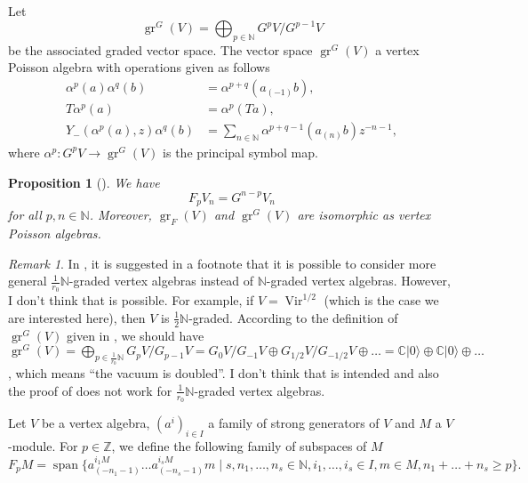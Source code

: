 \documentclass[12pt, reqno]{amsart}
\newtheorem{proposition}[theorem]{Proposition}
\theoremstyle{remark}
\newtheorem{remark}[theorem]{Remark}
\DeclareMathOperator{\Vir}{Vir}
\DeclareMathOperator{\gr}{gr}
\DeclareMathOperator{\vspan}{span}
\newcommand{\vac}{|0\rangle}
\begin{document}
Let
\begin{equation*}
  \gr^G(V) = \bigoplus_{p \in \mathbb{N}}G^pV/G^{p - 1}V
\end{equation*}
be the associated graded vector space.
The vector space $\gr^G(V)$ a vertex Poisson algebra with operations given as follows
\begin{align*}
  \alpha^p(a)\alpha^q(b) &= \alpha^{p + q}(a_{(-1)}b), \\
  T\alpha^p(a) &= \alpha^p(Ta), \\
  Y_-(\alpha^p(a), z)\alpha^q(b) &= \sum_{n \in \mathbb{N}}\alpha^{p + q - 1}(a_{(n)}b)z^{-n - 1},
\end{align*}
where $\alpha^p: G^pV \to \gr^G(V)$ is the principal symbol map.

\begin{proposition}[{\cite[Proposition 2.6.1]{arakawa_remark_2012}}]
  \label{prp:3}
  We have
  \begin{equation*}
    F_pV_n = G^{n - p}V_n
  \end{equation*}
  for all $p, n \in \mathbb{N}$.
  Moreover, $\gr_F(V)$ and $\gr^G(V)$ are isomorphic as vertex Poisson algebras.
\end{proposition}

\begin{remark}
  \label{rmk:1}
  In \cite{arakawa_remark_2012}, it is suggested in a footnote that it is possible to consider more general $\tfrac{1}{r_0}\mathbb{N}$-graded vertex algebras instead of $\mathbb{N}$-graded vertex algebras.
  However, I don't think that is possible.
  For example, if $V = \Vir^{1/2}$ (which is the case we are interested here), then $V$ is $\tfrac{1}{2}\mathbb{N}$-graded.
  According to the definition of $\gr^G(V)$ given in \cite{arakawa_remark_2012}, we should have $\gr^G(V) = \bigoplus_{p \in \tfrac{1}{r_0}\mathbb{N}}G_pV/G_{p - 1}V = G_0V/G_{-1}V \oplus G_{1/2}V/G_{-1/2}V \oplus \dots = \mathbb{C}\vac \oplus \mathbb{C}\vac \oplus \dots$, which means ``the vacuum is doubled''.
  I don't think that is intended and also the proof of \cite[Proposition 2.6.1]{arakawa_remark_2012} does not work for $\tfrac{1}{r_0}\mathbb{N}$-graded vertex algebras.
\end{remark}

Let $V$ be a vertex algebra, $(a^i)_{i \in I}$ a family of strong generators of $V$ and $M$ a $V$-module.
For $p \in \mathbb{Z}$, we define the following family of subspaces of $M$
\begin{equation*}
  F_pM = \vspan \{a^{i_1M}_{(-n_1 - 1)}\dots a^{i_sM}_{(-n_s - 1)}m \mid s, n_1, \dots, n_s \in \mathbb{N}, i_1, \dots, i_s \in I, m \in M, n_1 + \dots + n_s \ge p\}.
\end{equation*}
\end{document}

